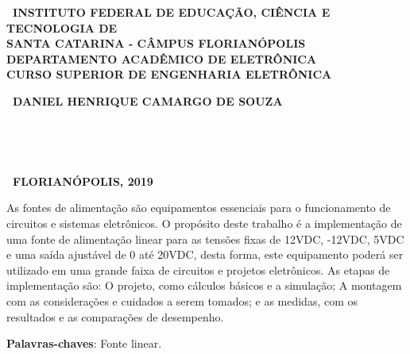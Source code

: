 \documentclass[
	12pt,				%
	openright,			%
	twoside,			%
	a4paper,			%
	chapter=TITLE,		%
	english,			%
	french,             %
	spanish,			%
	brazil,				%
	]{abntex2}
\begin{document}
\begin{capa}%
    \center
    \ABNTEXchapterfont\bfseries\ INSTITUTO FEDERAL DE EDUCAÇÃO, CIÊNCIA E TECNOLOGIA DE\\SANTA CATARINA - CÂMPUS FLORIANÓPOLIS\\DEPARTAMENTO ACADÊMICO DE ELETRÔNICA\\CURSO SUPERIOR DE ENGENHARIA ELETRÔNICA
    
    \vspace*{3.0cm}     %
    
    \ABNTEXchapterfont\bfseries\ DANIEL HENRIQUE CAMARGO DE SOUZA
    
    \begin{vplace}[0.5]
        \begin{center}
            \ABNTEXchapterfont\bfseries\LARGE\imprimirtitulo
        \end{center}
    \end{vplace}
	
    \hspace{.45\textwidth}
    \begin{minipage}{.5\textwidth}
        \SingleSpacing
        \imprimirpreambulo
    \end{minipage}%
    \vspace*{\fill}

    \large\imprimirorientadorRotulo~\imprimirorientador\par
    \large\imprimircoorientadorRotulo~\imprimircoorientador    
    
    \ABNTEXchapterfont\bfseries\ FLORIANÓPOLIS, 2019
\end{capa}


\setlength{\absparsep}{18pt} %

\begin{resumo}
 
As fontes de alimentação são equipamentos essenciais para o funcionamento de circuitos e sistemas eletrônicos. O propósito deste trabalho é a implementação de  uma fonte de alimentação linear para as tensões fixas de 12VDC, -12VDC, 5VDC e uma saída ajustável de 0 até 20VDC, desta forma, este equipamento poderá ser  utilizado em uma grande faixa de circuitos e projetos eletrônicos. As etapas de implementação são: O projeto, como cálculos básicos e a simulação; A montagem  com as considerações e cuidados a serem tomados; e as medidas, com os resultados e as comparações de desempenho. 

\noindent
\textbf{Palavras-chaves}: Fonte linear. 

\end{resumo}
\end{document}
